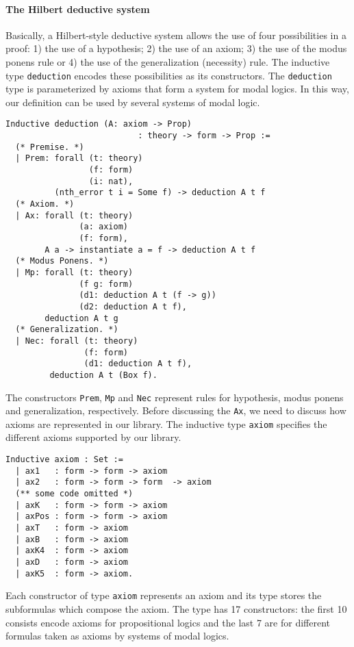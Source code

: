 \documentclass[sigconf,anonymous]{acmart}
\begin{document}
\paragraph{The Hilbert deductive system}
Basically, a Hilbert-style deductive system allows the use of four
possibilities in a proof: 1) the use of a hypothesis; 2) the use of an axiom;
3) the use of the modus ponens rule or 4) the use of the generalization (necessity)
rule. The inductive type \texttt{deduction} encodes these possibilities
as its constructors. The \texttt{deduction} type is parameterized by
axioms that form a system for modal logics. In this way, our definition can be
used by several systems of modal logic.
\begin{verbatim}
Inductive deduction (A: axiom -> Prop)
                           : theory -> form -> Prop :=
  (* Premise. *)
  | Prem: forall (t: theory)
                 (f: form)
                 (i: nat),
          (nth_error t i = Some f) -> deduction A t f
  (* Axiom. *)
  | Ax: forall (t: theory)
               (a: axiom)
               (f: form),
        A a -> instantiate a = f -> deduction A t f
  (* Modus Ponens. *)
  | Mp: forall (t: theory)
               (f g: form)
               (d1: deduction A t (f -> g))
               (d2: deduction A t f),
        deduction A t g
  (* Generalization. *)
  | Nec: forall (t: theory)
                (f: form)
                (d1: deduction A t f),
         deduction A t (Box f).
\end{verbatim}
The constructors \texttt{Prem}, \texttt{Mp} and \texttt{Nec}
represent rules for hypothesis, modus ponens and generalization, respectively.
Before discussing the \texttt{Ax}, we need to discuss how axioms are
represented in our library. The inductive type \texttt{axiom} specifies
the different axioms supported by our library.
\begin{verbatim}
Inductive axiom : Set :=
  | ax1   : form -> form -> axiom
  | ax2   : form -> form -> form  -> axiom
  (** some code omitted *)
  | axK   : form -> form -> axiom
  | axPos : form -> form -> axiom
  | axT   : form -> axiom
  | axB   : form -> axiom
  | axK4  : form -> axiom
  | axD   : form -> axiom
  | axK5  : form -> axiom.
\end{verbatim}
Each constructor of type \texttt{axiom} represents an axiom and
its type stores the subformulas which compose the axiom. The type has
17 constructors: the first 10 consists encode axioms for propositional logics
and the last 7 are for different formulas taken as axioms by systems of modal logics.
\end{document}
